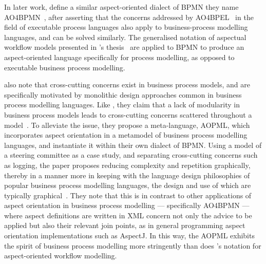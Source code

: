 In later work, \citeauthor{charfi2010AO4BPMN} define a similar aspect-oriented
dialect of BPMN they name AO4BPMN~\cite{charfi2010AO4BPMN}, after asserting that
the concerns addressed by
AO4BPEL~\cite{Charfi2006AspectOrientedWL,charfi2007ao4bpel} in the field of
executable process languages also apply to business-process modelling languages,
and can be solved similarly. The generalised notation of aspectual
workflow models presented in \citeauthor{Charfi2006AspectOrientedWL}'s
thesis~\cite{Charfi2006AspectOrientedWL} are applied to BPMN to produce an
aspect-oriented language specifically for process modelling, as opposed to
executable business process modelling.

 also note that cross-cutting concerns exist in
business process models, and are specifically motivated by monolithic design
approaches common in business process modelling languages. Like
\citeauthor{kiczales1997aspect}, they claim that a lack of modularity in
business process models leads to cross-cutting concerns scattered throughout a
model~\cite{Cappelli_AOBPM}. To alleviate the issue, they propose a
meta-language, AOPML, which incorporates aspect orientation in a metamodel of
business process modelling languages, and instantiate it within their own
dialect of BPMN. Using a model of a steering committee as a case study, and
separating cross-cutting concerns such as logging, the paper proposes reducing
complexity and repetition graphically, thereby in a manner more in keeping with
the language design philosophies of popular business process modelling
languages, the design and use of which are typically
graphical~\cite{OMG-BPMN-SPEC,opm_original,OMG-UML-SPEC}. They note that this is
in contrast to other applications of aspect orientation in business process
modelling --- specifically AO4BPMN --- where aspect definitions are written in
XML concern not only the advice to be applied but also their relevant join
points, as in general programming aspect orientation implementations such as
AspectJ. In this way, the AOPML exhibits the spirit of business process
modelling more stringently than does \citeauthor{Charfi2006AspectOrientedWL}'s
notation for aspect-oriented workflow modelling.

